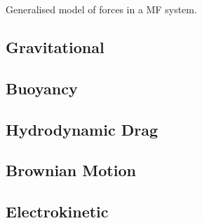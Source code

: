 Generalised model of forces in a MF system.

\subsection{Gravitational}
\subsection{Buoyancy}
\subsection{Hydrodynamic Drag}
\subsection{Brownian Motion}
\subsection{Electrokinetic}
